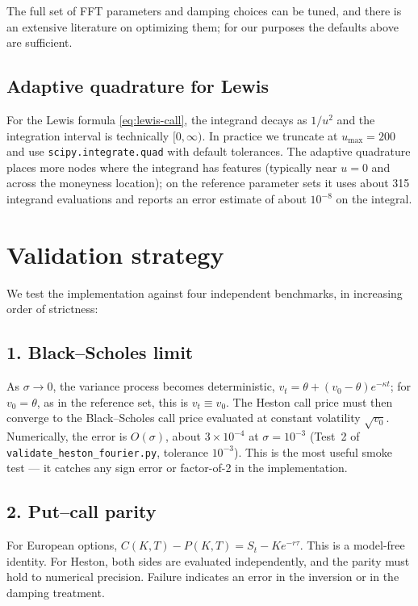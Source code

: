 \documentclass[11pt]{article}
\theoremstyle{plain}
\theoremstyle{definition}
\theoremstyle{remark}
\begin{document}
The full set of FFT parameters and damping choices can be tuned, and there is an extensive literature on optimizing them; for our purposes the defaults above are sufficient.

\subsection{Adaptive quadrature for Lewis}

For the Lewis formula \eqref{eq:lewis-call}, the integrand decays as \(1/u^2\) and the integration interval is technically \([0, \infty)\). In practice we truncate at \(u_{\max} = 200\) and use \texttt{scipy.integrate.quad} with default tolerances. The adaptive quadrature places more nodes where the integrand has features (typically near \(u = 0\) and across the moneyness location); on the reference parameter sets it uses about 315 integrand evaluations and reports an error estimate of about \(10^{-8}\) on the integral.

\section{Validation strategy}

We test the implementation against four independent benchmarks, in increasing order of strictness:

\subsection*{1. Black--Scholes limit}
As \(\sigma \to 0\), the variance process becomes deterministic, \(v_t = \theta + (v_0 - \theta) e^{-\kappa t}\); for \(v_0 = \theta\), as in the reference set, this is \(v_t \equiv v_0\). The Heston call price must then converge to the Black--Scholes call price evaluated at constant volatility \(\sqrt{v_0}\). Numerically, the error is \(O(\sigma)\), about \(3 \times 10^{-4}\) at \(\sigma = 10^{-3}\) (Test~2 of \texttt{validate\_heston\_fourier.py}, tolerance \(10^{-3}\)). This is the most useful smoke test --- it catches any sign error or factor-of-2 in the implementation.

\subsection*{2. Put--call parity}
For European options, \(C(K, T) - P(K, T) = S_t - K e^{-r\tau}\). This is a model-free identity. For Heston, both sides are evaluated independently, and the parity must hold to numerical precision. Failure indicates an error in the inversion or in the damping treatment.
\end{document}
